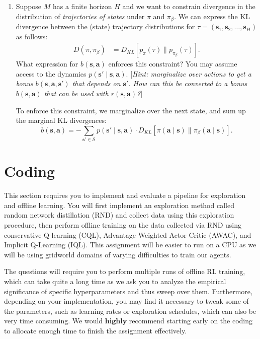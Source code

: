 \documentclass{article}
\def\s{\mathbf{s}}
\def\a{\mathbf{a}}
\def\pib{\pi_{\beta}}
\begin{document}
\begin{enumerate}
    \item Suppose $M$ has a finite horizon $H$ and we want to constrain divergence in the distribution of \emph{trajectories of states} under $\pi$ and $\pib$. We can express the KL divergence between the (state) trajectory distributions for $\tau=(\s_1,\s_2,\ldots,\s_H)$ as follows:
	\begin{align*}
	    D(\pi,\pib)&= D_{KL}[p_{\pi}(\tau)\|p_{\pib}(\tau)].
   	\end{align*} 
   	What expression for $b(\s,\a)$ enforces this constraint? You may assume access to the dynamics $p(\s'\mid\s,\a)$. [\emph{Hint: marginalize over actions to get a bonus $b(\s,\a,\s')$ that depends on $\s'$. How can this be converted to a bonus $b(\s,\a)$ that can be used with $r(\s,\a)$?}]

    \begin{sol}
        To enforce this constraint, we marginalize over the next state, and sum up the marginal KL divergences:
        \[b(\s, \a) = -\sum_{\s' \in \mathcal{S}} p(\s ' \mid \s, \a) \cdot D_{KL}[\pi(\a\mid\s)\|\pib(\a\mid\s)].\]
    \end{sol}
\end{enumerate}

\newpage

\section{Coding}
\label{sec:coding}
This section requires you to implement and evaluate a pipeline for exploration and offline learning. You will first implement an exploration method called random network distillation (RND) and collect data using this exploration procedure, then perform offline training on the data collected via RND using conservative Q-learning (CQL), Advantage Weighted Actor Critic (AWAC), and Implicit Q-Learning (IQL). 
This assignment will be easier to run on a CPU as we will be using gridworld domains of varying difficulties to train our agents. 

The questions will require you to perform multiple runs of offline RL training, which can take quite a long time as we ask you to analyze the empirical significance of specific hyperparameters and thus sweep over them. Furthermore, depending on your implementation, you may find it necessary to tweak some of the parameters, such as learning rates or exploration schedules, which can also be very time consuming. We would $\textbf{highly}$ recommend starting early on the coding to allocate enough time to finish the assignment effectively.
\end{document}
